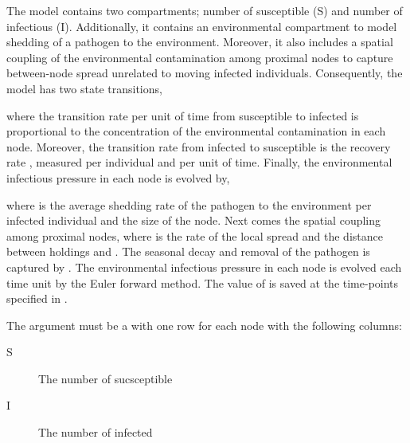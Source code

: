 \documentclass[letterpaper]{book}
\begin{document}
\begin{Details}
The  model contains two compartments; number of
susceptible (S) and number of infectious (I). Additionally, it
contains an environmental compartment to model shedding of a
pathogen to the environment. Moreover, it also includes a spatial
coupling of the environmental contamination among proximal nodes
to capture between-node spread unrelated to moving infected
individuals. Consequently, the model has two state transitions,



where the transition rate per unit of time from susceptible to
infected is proportional to the concentration of the environmental
contamination \eqn{\varphi}{} in each node. Moreover, the
transition rate from infected to susceptible is the recovery rate
\eqn{\gamma}{}, measured per individual and per unit of
time. Finally, the environmental infectious pressure in each node
is evolved by,


where \eqn{\alpha}{} is the average shedding rate of the pathogen to
the environment per infected individual and  the
size of the node. Next comes the spatial coupling among proximal
nodes, where  is the rate of the local spread and
 the distance between holdings  and
. The seasonal decay and removal of the pathogen is
captured by . The environmental infectious pressure
 in each node is evolved each time unit by
the Euler forward method. The value of  is
saved at the time-points specified in .

The argument  must be a  with one row for
each node with the following columns:
\begin{description}

\item[S] The number of sucsceptible
\item[I] The number of infected

\end{description}

\end{Details}
%
\begin{Value}
\end{Value}
\end{document}
